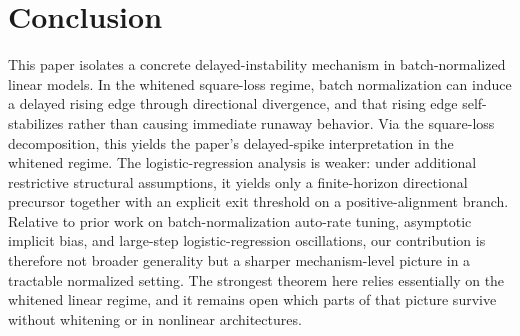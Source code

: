 \documentclass[pdflatex,sn-basic]{sn-jnl}%
\theoremstyle{thmstyleone}%
\begin{document}
\section{Conclusion}

This paper isolates a concrete delayed-instability mechanism in batch-normalized linear models. In the whitened square-loss regime, batch normalization can induce a delayed rising edge through directional divergence, and that rising edge self-stabilizes rather than causing immediate runaway behavior. Via the square-loss decomposition, this yields the paper's delayed-spike interpretation in the whitened regime. The logistic-regression analysis is weaker: under additional restrictive structural assumptions, it yields only a finite-horizon directional precursor together with an explicit exit threshold on a positive-alignment branch. Relative to prior work on batch-normalization auto-rate tuning, asymptotic implicit bias, and large-step logistic-regression oscillations, our contribution is therefore not broader generality but a sharper mechanism-level picture in a tractable normalized setting. The strongest theorem here relies essentially on the whitened linear regime, and it remains open which parts of that picture survive without whitening or in nonlinear architectures.
\end{document}
